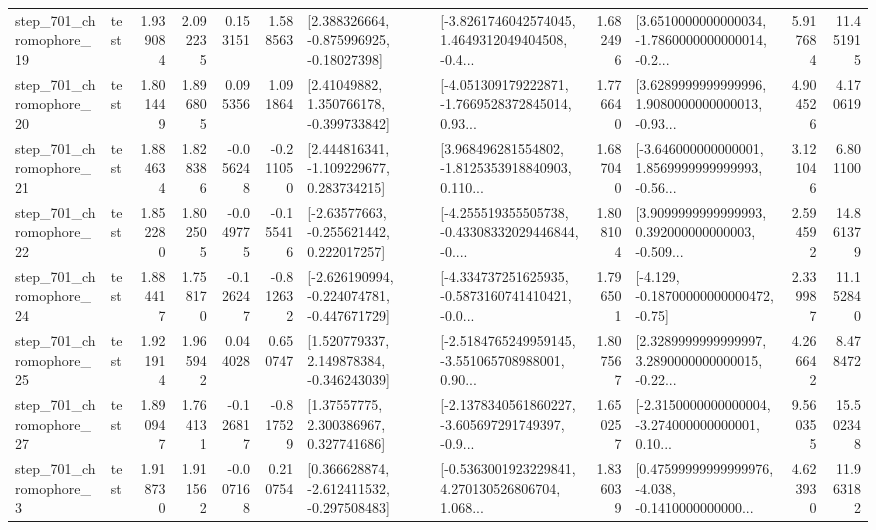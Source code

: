 \begin{tabular}{llrrrrllrlrr}
  step\_701\_chromophore\_19 &      test &      1.939084 &    2.092235 &      0.153151 &  1.588563 &    [2.388326664, -0.875996925, -0.18027398] &  [-3.8261746042574045, 1.4649312049404508, -0.4... &       1.682496 &  [3.6510000000000034, -1.7860000000000014, -0.2... &            5.917684 &         11.451915 \\
  step\_701\_chromophore\_20 &      test &      1.801449 &    1.896805 &      0.095356 &  1.091864 &     [2.41049882, 1.350766178, -0.399733842] &  [-4.051309179222871, -1.7669528372845014, 0.93... &       1.776640 &  [3.6289999999999996, 1.9080000000000013, -0.93... &            4.904526 &          4.170619 \\
  step\_701\_chromophore\_21 &      test &      1.884634 &    1.828386 &     -0.056248 & -0.211050 &    [2.444816341, -1.109229677, 0.283734215] &  [3.968496281554802, -1.8125353918840903, 0.110... &       1.687040 &  [-3.646000000000001, 1.8569999999999993, -0.56... &            3.121046 &          6.801100 \\
  step\_701\_chromophore\_22 &      test &      1.852280 &    1.802505 &     -0.049775 & -0.155416 &    [-2.63577663, -0.255621442, 0.222017257] &  [-4.255519355505738, -0.43308332029446844, -0.... &       1.808104 &  [3.9099999999999993, 0.392000000000003, -0.509... &            2.594592 &         14.861379 \\
  step\_701\_chromophore\_24 &      test &      1.884417 &    1.758170 &     -0.126247 & -0.812632 &  [-2.626190994, -0.224074781, -0.447671729] &  [-4.334737251625935, -0.5873160741410421, -0.0... &       1.796501 &              [-4.129, -0.18700000000000472, -0.75] &            2.339987 &         11.152840 \\
  step\_701\_chromophore\_25 &      test &      1.921914 &    1.965942 &      0.044028 &  0.650747 &    [1.520779337, 2.149878384, -0.346243039] &  [-2.5184765249959145, -3.551065708988001, 0.90... &       1.807567 &  [2.3289999999999997, 3.2890000000000015, -0.22... &            4.266642 &          8.478472 \\
  step\_701\_chromophore\_27 &      test &      1.890947 &    1.764131 &     -0.126817 & -0.817529 &      [1.37557775, 2.300386967, 0.327741686] &  [-2.1378340561860227, -3.605697291749397, -0.9... &       1.650257 &  [-2.3150000000000004, -3.274000000000001, 0.10... &            9.560355 &         15.502348 \\
   step\_701\_chromophore\_3 &      test &      1.918730 &    1.911562 &     -0.007168 &  0.210754 &   [0.366628874, -2.612411532, -0.297508483] &  [-0.5363001923229841, 4.270130526806704, 1.068... &       1.836039 &  [0.47599999999999976, -4.038, -0.1410000000000... &            4.623930 &         11.963182 \\

\end{tabular}
